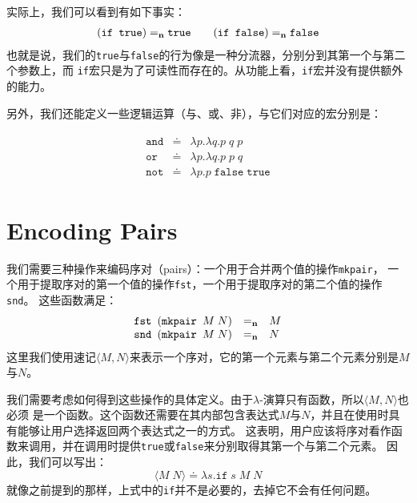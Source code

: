 \documentclass[12pt]{article}
\begin{document}
\noindent{}实际上，我们可以看到有如下事实：
\begin{gather*}
(\texttt{if true})   =_{\bf{n}}  \texttt{true} \quad\quad
(\texttt{if false})  =_{\bf{n}}  \texttt{false}
\end{gather*}
\noindent{}也就是说，我们的\texttt{true}与\texttt{false}的行为像是一种分流器，分别分到其第一个与第二个参数上，而
\texttt{if}宏只是为了可读性而存在的。从功能上看，\texttt{if}宏并没有提供额外的能力。

\indent{}另外，我们还能定义一些逻辑运算（与、或、非），与它们对应的宏分别是：
\begin{tcolorbox}[top=-0.8em,left=0mm,right=0mm]
\begin{gather*}
\begin{array}{lcl}
\texttt{and} & \doteq & \lambda p.\lambda q.p\;q\;p\\
\texttt{or}  & \doteq & \lambda p.\lambda q.p\;p\;q\\
\texttt{not} & \doteq & \lambda p.p\;\texttt{false}\;\texttt{true}
\end{array}
\end{gather*}
\end{tcolorbox}
\clearpage

\section{Encoding Pairs}
\indent{}我们需要三种操作来编码序对（pairs）：一个用于合并两个值的操作\texttt{mkpair}，
一个用于提取序对的第一个值的操作\texttt{fst}，一个用于提取序对的第二个值的操作\texttt{snd}。
这些函数满足：
\begin{gather*}
\begin{array}{lcl}
\texttt{fst }(\texttt{mkpair }M\;N) & =_{\bf{n}} & M\\
\texttt{snd }(\texttt{mkpair }M\;N) & =_{\bf{n}} & N
\end{array}
\end{gather*}
\noindent{}这里我们使用速记$\langle{}M,N\rangle$来表示一个序对，它的第一个元素与第二个元素分别是$M$与$N$。

\indent{}我们需要考虑如何得到这些操作的具体定义。由于$\lambda$-演算只有函数，所以$\langle{}M,N\rangle$也必须
是一个函数。这个函数还需要在其内部包含表达式$M$与$N$，并且在使用时具有能够让用户选择返回两个表达式之一的方式。
这表明，用户应该将序对看作函数来调用，并在调用时提供\texttt{true}或\texttt{false}来分别取得其第一个与第二个元素。
因此，我们可以写出：
\begin{displaymath}
\langle{}M\;N\rangle \doteq \lambda{}s.\texttt{if}\;s\;M\;N
\end{displaymath}
\noindent{}就像之前提到的那样，上式中的\texttt{if}并不是必要的，去掉它不会有任何问题。
\end{document}
